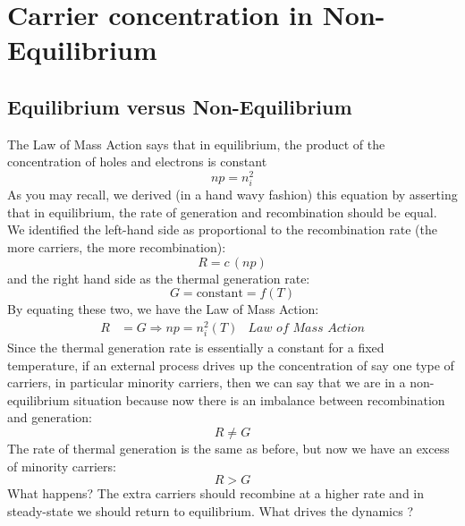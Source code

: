 \section{Carrier concentration in Non-Equilibrium}
\subsection{Equilibrium versus Non-Equilibrium}
The Law of Mass Action says that in equilibrium, the product of the concentration of holes and electrons is constant
    \begin{equation*}
        np = n_i^2
    \end{equation*}
As you may recall, we derived (in a hand wavy fashion) this equation by asserting that in equilibrium, the rate of generation and recombination should be equal.  We identified the left-hand side as proportional to the recombination rate (the more carriers, the more recombination):
    \begin{equation*}
        R = c\,(np) 
    \end{equation*}
and the right hand side as the thermal generation rate:
    \begin{equation*}
        G = \text{constant} = f(T) 
    \end{equation*}
By equating these two, we have the Law of Mass Action:
    \begin{align}
        R &= G \Rightarrow np = n_i^2(T) &\textit{Law of Mass Action}
    \end{align}
Since the thermal generation rate is essentially a constant for a fixed temperature, if an external process drives up the concentration of say one type of carriers, in particular minority carriers, then we can say that we are in a non-equilibrium situation because now there is an imbalance between recombination and generation:  
    \begin{equation*}
        R \ne G 
    \end{equation*}
The rate of thermal generation is the same as before, but now we have an excess of minority carriers: 
    \begin{equation*}
        R > G 
    \end{equation*}
What happens? The extra carriers should recombine at a higher rate and in steady-state we should return to equilibrium.  What drives the dynamics ?
